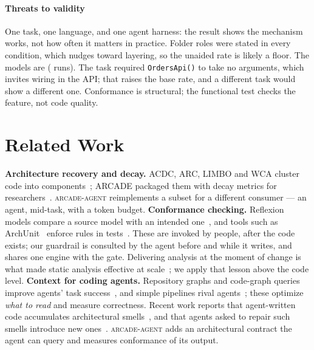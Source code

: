 \documentclass[10pt,conference]{IEEEtran}
\newcommand{\tool}[1]{\texttt{#1}}
\newcommand{\arcade}{\textsc{arcade-agent}}
\begin{document}
\paragraph*{Threats to validity}
One task, one language, and one agent harness: the result shows the mechanism
works, not how often it matters in practice. Folder roles were stated in every
condition, which nudges toward layering, so the unaided rate is likely a floor.
The models are \ModelNames{} (\NumRuns{} runs). The task required
\tool{OrdersApi()} to take no arguments, which invites wiring in the API; that
raises the base rate, and a different task would show a different one. Conformance is
structural; the functional test checks the feature, not code quality.

\section{Related Work}
\label{sec:related}
\textbf{Architecture recovery and decay.} ACDC, ARC, LIMBO and WCA cluster code
into components~\cite{tzerpos2000acdc,garcia2011arc,andritsos2004limbo,maqbool2004wca};
ARCADE packaged them with decay metrics for
researchers~\cite{laser2020arcade,behnamghader2017evolution,le2015change}.
\arcade{} reimplements a subset for a different consumer --- an agent, mid-task,
with a token budget.
\textbf{Conformance checking.} Reflexion models compare a source model with an
intended one~\cite{murphy1995reflexion}, and tools such as
ArchUnit~\cite{archunit} enforce rules in tests~\cite{passos2010conformance}.
These are invoked by people, after the code exists; our guardrail is consulted
by the agent before and while it writes, and shares one engine with the gate.
Delivering analysis at the moment of change is what made static analysis
effective at scale~\cite{tricorder}; we apply that lesson above the code level.
\textbf{Context for coding agents.} Repository graphs and code-graph queries
improve agents' task success~\cite{repograph,codexgraph}, and simple pipelines
rival agents~\cite{agentless}; these optimize \emph{what to read} and measure
correctness. Recent work reports that agent-written code accumulates
architectural smells~\cite{zhu2026decay}, and that agents asked to repair such smells introduce new ones~\cite{smellbench2026}. \arcade{} adds an architectural
contract the agent can query and measures conformance of its output.
\end{document}
